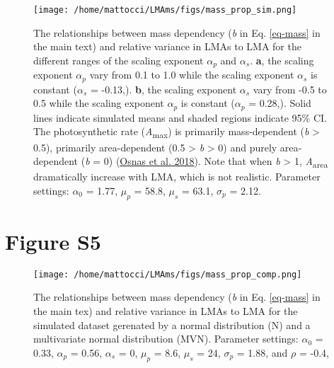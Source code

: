 \documentclass[
  12pt,
  letterpaper,
  DIV=11,
  numbers=noendperiod]{scrartcl}
\begin{document}
\begin{figure}

{\centering \texttt{[image: /home/mattocci/LMAms/figs/mass\_prop\_sim.png]}

}

\caption{\label{fig-mass_prop_sim}The relationships between mass
dependency (\emph{b} in Eq. \ref{eq-mass} in the main text) and relative
variance in LMAs to LMA for the different ranges of the scaling exponent
\(\alpha_p\) and \(\alpha_s\). \textbf{a}, the scaling exponent
\(\alpha_p\) vary from 0.1 to 1.0 while the scaling exponent
\(\alpha_s\) is constant (\(\alpha_s\) = -0.13,). \textbf{b}, the
scaling exponent \(\alpha_s\) vary from -0.5 to 0.5 while the scaling
exponent \(\alpha_p\) is constant (\(\alpha_p\) = 0.28,). Solid lines
indicate simulated means and shaded regions indicate 95\% CI. The
photosynthetic rate (\emph{A}\textsubscript{max}) is primarily
mass-dependent (\emph{b} \textgreater{} 0.5), primarily area-dependent
(0.5 \textgreater{} \emph{b} \textgreater{} 0) and purely area-dependent
(\emph{b} = 0) (\protect\hyperlink{ref-Osnas2018}{Osnas et al. 2018}).
Note that when \emph{b} \textgreater{} 1, \emph{A}\textsubscript{area}
dramatically increase with LMA, which is not realistic. Parameter
settings: \(\alpha_0\) = 1.77, \(\mu_p\) = 58.8, \(\mu_s\) = 63.1,
\(\sigma_p\) = 2.12.}

\end{figure}

\newpage

\hypertarget{figure-s5}{%
\section{Figure S5}\label{figure-s5}}

\begin{figure}

{\centering \texttt{[image: /home/mattocci/LMAms/figs/mass\_prop\_comp.png]}

}

\caption{\label{fig-mass_prop_comp}The relationships between mass
dependency (\emph{b} in Eq. \ref{eq-mass} in the main tex) and relative
variance in LMAs to LMA for the simulated dataset gerenated by a normal
distribution (N) and a multivariate normal distribution (MVN). Parameter
settings: \(\alpha_0\) = 0.33, \(\alpha_p\) = 0.56, \(\alpha_s\) = 0,
\(\mu_p\) = 8.6, \(\mu_s\) = 24, \(\sigma_p\) = 1.88, and \(\rho\) =
-0.4,}

\end{figure}
\end{document}
